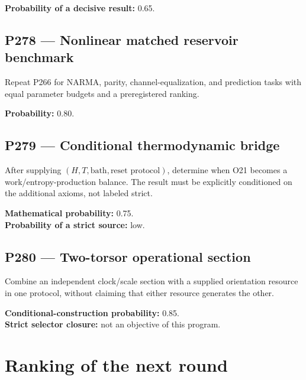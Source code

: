 \documentclass[11pt,a4paper,openany]{report}
\begin{document}
\textbf{Probability of a decisive result:} 0.65.

\section{P278 --- Nonlinear matched reservoir benchmark}

Repeat P266 for NARMA, parity, channel-equalization, and prediction tasks with equal parameter budgets and a preregistered ranking.

\textbf{Probability:} 0.80.

\section{P279 --- Conditional thermodynamic bridge}

After supplying \((H,T,\text{bath},\text{reset protocol})\), determine when O21 becomes a work/\allowbreak{}entropy-production balance. The result must be explicitly conditioned on the additional axioms, not labeled strict.

\textbf{Mathematical probability:} 0.75.\\
\textbf{Probability of a strict source:} low.

\section{P280 --- Two-torsor operational section}

Combine an independent clock/\allowbreak{}scale section with a supplied orientation resource in one protocol, without claiming that either resource generates the other.

\textbf{Conditional-construction probability:} 0.85.\\
\textbf{Strict selector closure:} not an objective of this program.

\chapter{Ranking of the next round}
\end{document}
